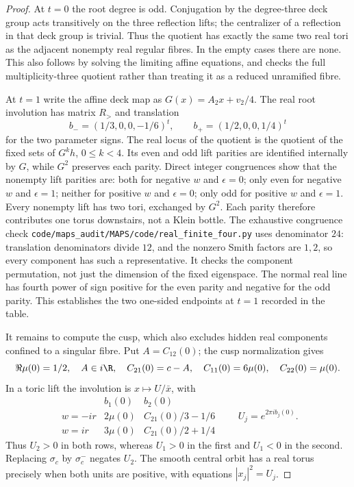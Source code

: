 \begin{proof}
At $t=0$ the root degree is odd. Conjugation by the degree-three deck
group acts transitively on the three reflection lifts; the centralizer
of a reflection in that deck group is trivial.
Thus the quotient has exactly the same two real tori as the adjacent
nonempty real regular fibres. In the empty cases there are none. This
also follows by solving the limiting affine equations, and checks the
full multiplicity-three quotient rather than treating it as a reduced
unramified fibre.

At $t=1$ write the affine deck map as
$G(x)=A_2x+v_2/4$. The real root involution has matrix $R_>$ and
translation
\[
 b_-=(1/3,0,0,-1/6)^t,
 \qquad b_+=(1/2,0,0,1/4)^t
\]
for the two parameter signs. The real locus of the quotient is the
quotient of the fixed sets of $G^kh$, $0\leq k<4$. Its even and odd
lift parities are identified internally by $G$, while $G^2$ preserves
each parity. Direct integer congruences show that the nonempty lift
parities are: both for negative $w$ and $\epsilon=0$; only even for
negative $w$ and $\epsilon=1$; neither for positive $w$ and $\epsilon=0$;
only odd for positive $w$ and $\epsilon=1$. Every nonempty lift has
two tori, exchanged by $G^2$. Each parity therefore contributes one
torus downstairs, not a Klein bottle. The exhaustive congruence check
\texttt{code/maps\_audit/MAPS/code/real\_finite\_four.py} uses denominator $24$: translation
denominators divide $12$, and the nonzero Smith factors are $1,2$, so
every component has such a representative. It checks the component
permutation, not just the dimension of the fixed eigenspace. The normal
real line has fourth power of sign positive for the even parity and
negative for the odd parity. This establishes the two one-sided
endpoints at $t=1$ recorded in the table.

It remains to compute the cusp, which also excludes hidden real
components confined to a singular fibre. Put
$A=C_{12}(0)$; the cusp normalization gives
\[
 \Re\mu(0)=1/2,\quad A\in i\R,\quad C_{21}(0)=c-A,
 \quad C_{11}(0)=6\mu(0),\quad C_{22}(0)=\mu(0).
\]
In a toric lift the involution is
$x\mapsto U/\bar x$, with
\[
\begin{array}{c|cc}
 &b_1(0)&b_2(0)\\\hline
 w=-ir&2\mu(0)&C_{21}(0)/3-1/6\\
 w=ir&3\mu(0)&C_{21}(0)/2+1/4
\end{array}
\qquad U_j=e^{2\pi i b_j(0)}.
\label{mapsI:real-eq-7}
\]
Thus $U_2>0$ in both rows, whereas $U_1>0$ in the first and $U_1<0$
in the second. Replacing $\sigma_c$ by $\sigma_c^-$ negates $U_2$.
The smooth central orbit has a real torus precisely when both units
are positive, with equations $|x_j|^2=U_j$.


\end{proof}
